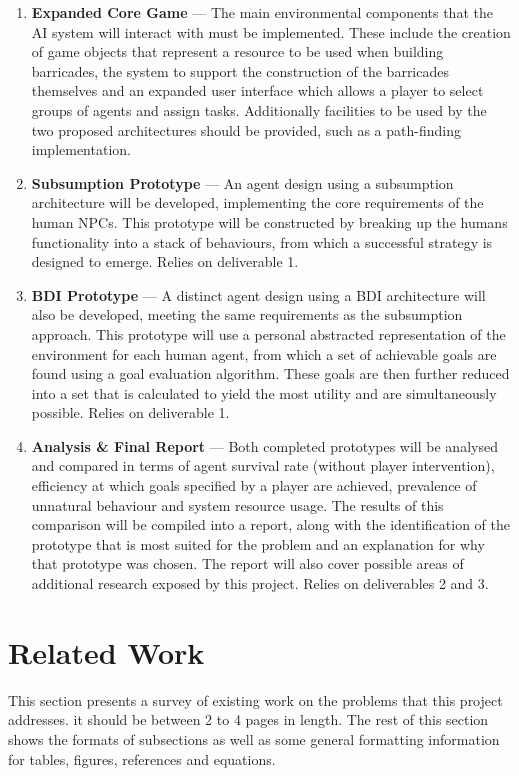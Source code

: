 \documentclass[12pt,a4paper]{article}
\newcommand{\deliverable}[2]{\item \textbf{#1} --- #2}
\begin{document}
\begin{enumerate}
  \deliverable{Expanded Core Game}
  {The main environmental components that the AI system will interact with must be implemented. These include the creation of game objects that represent a resource to be used when building barricades, the system to support the construction of the barricades themselves and an expanded user interface which allows a player to select groups of agents and assign tasks. Additionally facilities to be used by the two proposed architectures should be provided, such as a path-finding implementation.}

  \deliverable{Subsumption Prototype}
  {An agent design using a subsumption architecture will be developed, implementing the core requirements of the human NPCs. This prototype will be constructed by breaking up the humans functionality into a stack of behaviours, from which a successful strategy is designed to emerge. Relies on deliverable 1.}

  \deliverable{BDI Prototype}
  {A distinct agent design using a BDI architecture will also be developed, meeting the same requirements as the subsumption approach. This prototype will use a personal abstracted representation of the environment for each human agent, from which a set of achievable goals are found using a goal evaluation algorithm. These goals are then further reduced into a set that is calculated to yield the most utility and are simultaneously possible. Relies on deliverable 1.}

  \deliverable{Analysis \& Final Report}
  {Both completed prototypes will be analysed and compared in terms of agent survival rate (without player intervention), efficiency at which goals specified by a player are achieved, prevalence of unnatural behaviour and system resource usage. The results of this comparison will be compiled into a report, along with the identification of the prototype that is most suited for the problem and an explanation for why that prototype was chosen. The report will also cover possible areas of additional research exposed by this project. Relies on deliverables 2 and 3.}
\end{enumerate}

\section{Related Work}
This section presents a survey of existing work on the problems that this project addresses.  it should be between 2 to 4 pages in length.  The rest of this section shows the formats of subsections as well as some general formatting information for tables, figures, references and equations.
\end{document}
